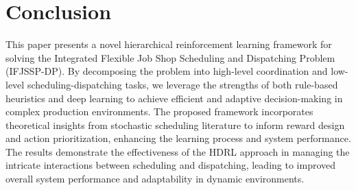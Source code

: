 \documentclass{article}
\begin{document}
\section{Conclusion}
This paper presents a novel hierarchical reinforcement learning framework for solving the Integrated Flexible Job Shop Scheduling and Dispatching Problem (IFJSSP-DP). By decomposing the problem into high-level coordination and low-level scheduling-dispatching tasks, we leverage the strengths of both rule-based heuristics and deep learning to achieve efficient and adaptive decision-making in complex production environments. The proposed framework incorporates theoretical insights from stochastic scheduling literature to inform reward design and action prioritization, enhancing the learning process and system performance.
The results demonstrate the effectiveness of the HDRL approach in managing the intricate interactions between scheduling and dispatching, leading to improved overall system performance and adaptability in dynamic environments.
\end{document}
